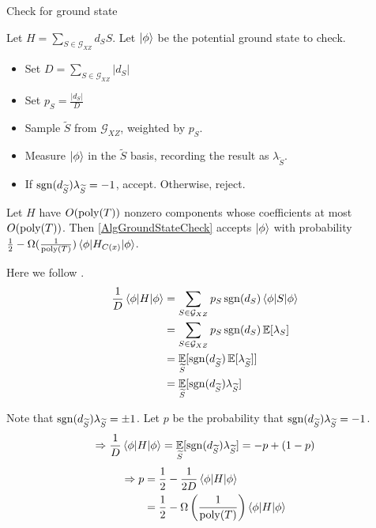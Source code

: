 \begin{algorithm}
	\caption{Check for ground state}
	\label{AlgGroundStateCheck}
		Let $H=\sum_{S\in\mathcal{G}_{XZ}} d_S S$.
		Let $\ket\phi$ be the potential ground state to check.
		\begin{itemize}
			\item Set $D = \sum_{S\in\mathcal{G}_{XZ}}|d_S|$
			\item Set $p_S = \frac{|d_S|}{D}$
			\item Sample $\widetilde{S}$ from $\mathcal{G}_{XZ}$, weighted by $p_S$.
			\item Measure $\ket\phi$ in the $\widetilde{S}$ basis, recording the result as $\lambda_{\widetilde{S}}$.
			\item If $\operatorname{sgn}(d_{\widetilde{S}})\lambda_{\widetilde{S}}=-1$, accept. Otherwise, reject.
		\end{itemize}
\end{algorithm}

\begin{thm}
	Let $H$ have $O(\operatorname*{\operatorname{poly}}(T))$ nonzero components whose coefficients at most $O(\operatorname*{\operatorname{poly}}(T))$.
	Then \cref{AlgGroundStateCheck} accepts $\ket{\phi}$ with probability $\frac{1}{2}-\Omega(\frac{1}{\operatorname*{\operatorname{poly}}(T)})\braket{\phi|H_{C(x)}|\phi}$.
\end{thm}
\begin{prf}
	Here we follow \cite{PhysRevA.93.022326}.
	\begin{align*}
		\frac{1}{D}\braket{\phi|H|\phi}&=\sum_{S\in\mathcal{G}_{XZ}} p_S\operatorname{sgn}(d_S)\braket{\phi|S|\phi}\\
		&=\sum_{S\in\mathcal{G}_{XZ}} p_S\operatorname{sgn}(d_S)\operatorname*{\mathbb{E}}[\lambda_S]\\
		&=\operatorname*{\mathbb{E}}_{\widetilde{S}}[\operatorname{sgn}(d_{\widetilde{S}})\operatorname*{\mathbb{E}}[\lambda_{\widetilde{S}}]]\\
		&=\operatorname*{\mathbb{E}}_{\widetilde{S}}[\operatorname{sgn}(d_{\widetilde{S}})\lambda_{\widetilde{S}}]
	\end{align*}

	Note that $\operatorname{sgn}(d_{\widetilde{S}})\lambda_{\widetilde{S}}=\pm1$. Let $p$ be the probability that $\operatorname{sgn}(d_{\widetilde{S}})\lambda_{\widetilde{S}}=-1$.
	$$\Rightarrow \frac{1}{D}\braket{\phi|H|\phi}=\operatorname*{\mathbb{E}}_{\widetilde{S}}[\operatorname{sgn}(d_{\widetilde{S}})\lambda_{\widetilde{S}}]=-p+(1-p)$$
	\begin{align*}
		\Rightarrow p&=\frac{1}{2}-\frac{1}{2D}\braket{\phi|H|\phi}\\
		&=\frac{1}{2}-\Omega\left(\frac{1}{\operatorname*{\operatorname{poly}}(T)}\right)\braket{\phi|H|\phi}
	\end{align*}
\end{prf}
